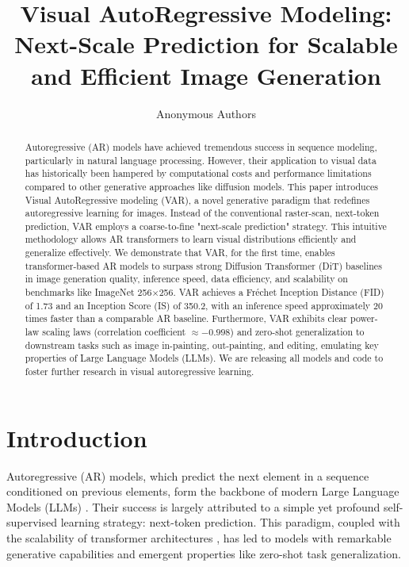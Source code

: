 \documentclass{article}
\title{Visual AutoRegressive Modeling: Next-Scale Prediction for Scalable and Efficient Image Generation}
\author{%
  Anonymous Authors \\
}
\begin{document}
\maketitle

\begin{abstract}
Autoregressive (AR) models have achieved tremendous success in sequence modeling, particularly in natural language processing. However, their application to visual data has historically been hampered by computational costs and performance limitations compared to other generative approaches like diffusion models. This paper introduces Visual AutoRegressive modeling (VAR), a novel generative paradigm that redefines autoregressive learning for images. Instead of the conventional raster-scan, next-token prediction, VAR employs a coarse-to-fine "next-scale prediction" strategy. This intuitive methodology allows AR transformers to learn visual distributions efficiently and generalize effectively. We demonstrate that VAR, for the first time, enables transformer-based AR models to surpass strong Diffusion Transformer (DiT) baselines in image generation quality, inference speed, data efficiency, and scalability on benchmarks like ImageNet 256$\times$256. VAR achieves a Fréchet Inception Distance (FID) of 1.73 and an Inception Score (IS) of 350.2, with an inference speed approximately 20 times faster than a comparable AR baseline. Furthermore, VAR exhibits clear power-law scaling laws (correlation coefficient $\approx -0.998$) and zero-shot generalization to downstream tasks such as image in-painting, out-painting, and editing, emulating key properties of Large Language Models (LLMs). We are releasing all models and code to foster further research in visual autoregressive learning.
\end{abstract}

\section{Introduction}
\label{sec:introduction}

Autoregressive (AR) models, which predict the next element in a sequence conditioned on previous elements, form the backbone of modern Large Language Models (LLMs) \cite{brown2020language}.
Their success is largely attributed to a simple yet profound self-supervised learning strategy: next-token prediction. This paradigm, coupled with the scalability of transformer architectures \cite{vaswani2017attention}, has led to models with remarkable generative capabilities and emergent properties like zero-shot task generalization.
\end{document}
